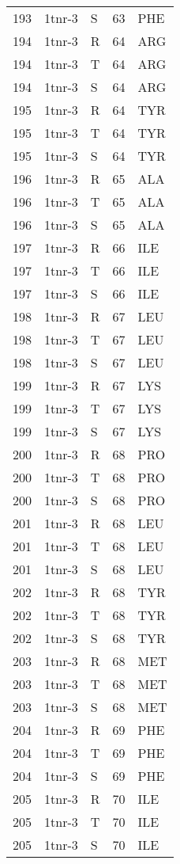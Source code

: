 \begin{tiny}
\begin{longtable}[l]{l|l|l|l|l}
	193 & 1tnr-3 & S & 63 & PHE \\
	194 & 1tnr-3 & R & 64 & ARG \\
	194 & 1tnr-3 & T & 64 & ARG \\
	194 & 1tnr-3 & S & 64 & ARG \\
	195 & 1tnr-3 & R & 64 & TYR \\
	195 & 1tnr-3 & T & 64 & TYR \\
	195 & 1tnr-3 & S & 64 & TYR \\
	196 & 1tnr-3 & R & 65 & ALA \\
	196 & 1tnr-3 & T & 65 & ALA \\
	196 & 1tnr-3 & S & 65 & ALA \\
	197 & 1tnr-3 & R & 66 & ILE \\
	197 & 1tnr-3 & T & 66 & ILE \\
	197 & 1tnr-3 & S & 66 & ILE \\
	198 & 1tnr-3 & R & 67 & LEU \\
	198 & 1tnr-3 & T & 67 & LEU \\
	198 & 1tnr-3 & S & 67 & LEU \\
	199 & 1tnr-3 & R & 67 & LYS \\
	199 & 1tnr-3 & T & 67 & LYS \\
	199 & 1tnr-3 & S & 67 & LYS \\
	200 & 1tnr-3 & R & 68 & PRO \\
	200 & 1tnr-3 & T & 68 & PRO \\
	200 & 1tnr-3 & S & 68 & PRO \\
	201 & 1tnr-3 & R & 68 & LEU \\
	201 & 1tnr-3 & T & 68 & LEU \\
	201 & 1tnr-3 & S & 68 & LEU \\
	202 & 1tnr-3 & R & 68 & TYR \\
	202 & 1tnr-3 & T & 68 & TYR \\
	202 & 1tnr-3 & S & 68 & TYR \\
	203 & 1tnr-3 & R & 68 & MET \\
	203 & 1tnr-3 & T & 68 & MET \\
	203 & 1tnr-3 & S & 68 & MET \\
	204 & 1tnr-3 & R & 69 & PHE \\
	204 & 1tnr-3 & T & 69 & PHE \\
	204 & 1tnr-3 & S & 69 & PHE \\
	205 & 1tnr-3 & R & 70 & ILE \\
	205 & 1tnr-3 & T & 70 & ILE \\
	205 & 1tnr-3 & S & 70 & ILE \\

\end{longtable}
\end{tiny}
